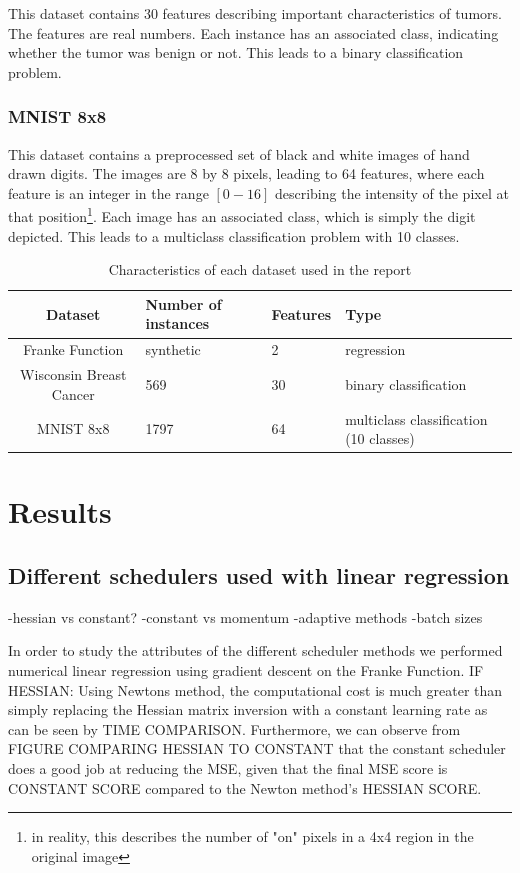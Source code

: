 \documentclass[onecolumn,10pt,cleanfoot]{asme2ej}
\begin{document}
This dataset contains 30 features describing important characteristics of tumors. The features are real numbers. Each instance has an associated class, indicating whether the tumor was benign or not. This leads to a binary classification problem.

\subsubsection{MNIST 8x8}

This dataset contains a preprocessed set of black and white images of hand drawn digits. The images are 8 by 8 pixels, leading to 64 features, where each feature is an integer in the range $[0-16]$ describing the intensity of the pixel at that position\footnote{in reality, this describes the number of "on" pixels in a 4x4 region in the original image}. Each image has an associated class, which is simply the digit depicted. This leads to a multiclass classification problem with 10 classes.

\begin{table}[h]
\caption{Characteristics of each dataset used in the report}
\begin{center}
\label{datasettable}
\begin{tabular}{| c | l | l | l |}
\hline
Dataset & Number of instances & Features & Type \\
\hline
Franke Function & synthetic & 2 & regression \\
Wisconsin Breast Cancer & 569 & 30 & binary classification \\
MNIST 8x8 & 1797 & 64 & multiclass classification (10 classes) \\
\hline
\end{tabular}
\end{center}
\end{table}

\section{Results}

\subsection{Different schedulers used with linear regression}

-hessian vs constant?
-constant vs momentum
-adaptive methods
-batch sizes

In order to study the attributes of the different scheduler methods we performed numerical linear regression using gradient descent on the Franke Function. IF HESSIAN: Using Newtons method, the computational cost is much greater than simply replacing the Hessian matrix inversion with a constant learning rate as can be seen by TIME COMPARISON. Furthermore, we can observe from FIGURE COMPARING HESSIAN TO CONSTANT that the constant scheduler does a good job at reducing the MSE, given that the final MSE score is CONSTANT SCORE compared to the Newton method's HESSIAN SCORE.
\end{document}
